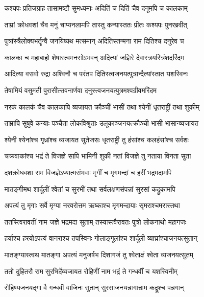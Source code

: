 \twolineshloka
{कश्यपः प्रतिजग्राह तासामष्टौ सुमध्यमाः}
{अदितिं च दितिं चैव दनूमपि च कालकाम्} %

\twolineshloka
{ताम्रां क्रोधवशां चैव मनुं चाप्यनलामपि}
{तास्तु कन्यास्ततः प्रीतः कश्यपः पुनरब्रवीत्} %

\twolineshloka
{पुत्रांस्त्रैलोक्यभर्तॄन्वै जनयिष्यथ मत्समान्}
{अदितिस्तन्मना राम दितिश्च दनुरेव च} %

\twolineshloka
{कालका च महाबाहो शेषास्त्वमनसोऽभवन्}
{अदित्यां जज्ञिरे देवास्त्रयस्त्रिंशदरिंदम} %

\twolineshloka
{आदित्या वसवो रुद्रा अश्विनौ च परंतप}
{दितिस्त्वजनयत्पुत्रान्दैत्यांस्तात यशस्विनः} %

\twolineshloka
{तेषामियं वसुमती पुरासीत्सवनार्णवा}
{दनुस्त्वजनयत्पुत्रमश्वग्रीवमरिंदम} %

\twolineshloka
{नरकं कालकं चैव कालकापि व्यजायत}
{क्रौञ्चीं भासीं तथा श्येनीं धृतराष्ट्रीं तथा शुकीम्} %

\twolineshloka
{ताम्रापि सुषुवे कन्याः पञ्चैता लोकविश्रुताः}
{उलूकाञ्जनयत्क्रौञ्ची भासी भासान्व्यजायत} %

\twolineshloka
{श्येनी श्येनांश्च गृध्रांश्च व्यजायत सुतेजसः}
{धृतराष्ट्री तु हंसांश्च कलहंसांश्च सर्वशः} %

\twolineshloka
{चक्रवाकांश्च भद्रं ते विजज्ञे सापि भामिनी}
{शुकी नतां विजज्ञे तु नताया विनता सुता} %

\twolineshloka
{दशक्रोधवशा राम विजज्ञेऽप्यात्मसंभवाः}
{मृगीं च मृगमन्दां च हरीं भद्रमदामपि} %

\twolineshloka
{मातङ्गीमथ शार्दूलीं श्वेतां च सुरभीं तथा}
{सर्वलक्षणसंपन्नां सुरसां कद्रुकामपि} %

\twolineshloka
{अपत्यं तु मृगाः सर्वे मृग्या नरवरोत्तम}
{ऋष्काश्च मृगमन्दायाः सृमराश्चमरास्तथा} %

\twolineshloka
{ततस्त्विरावतीं नाम जज्ञे भद्रमदा सुताम्}
{तस्यास्त्वैरावतः पुत्रो लोकनाथो महागजः} %

\twolineshloka
{हर्याश्च हरयोऽपत्यं वानराश्च तपस्विनः}
{गोलाङ्गूलांश्च शार्दूली व्याघ्रांश्चाजनयत्सुतान्} %

\twolineshloka
{मातङ्ग्यास्त्वथ मातङ्गा अपत्यं मनुजर्षभ}
{दिशागजं तु श्वेताक्षं श्वेता व्यजनयत्सुतम्} %

\twolineshloka
{ततो दुहितरौ राम सुरभिर्देव्यजायत}
{रोहिणीं नाम भद्रं ते गन्धर्वीं च यशस्विनीम्} %

\twolineshloka
{रोहिण्यजनयद्गा वै गन्धर्वी वाजिनः सुतान्}
{सुरसाजनयन्नागान्राम कद्रूश्च पन्नगान्} %

